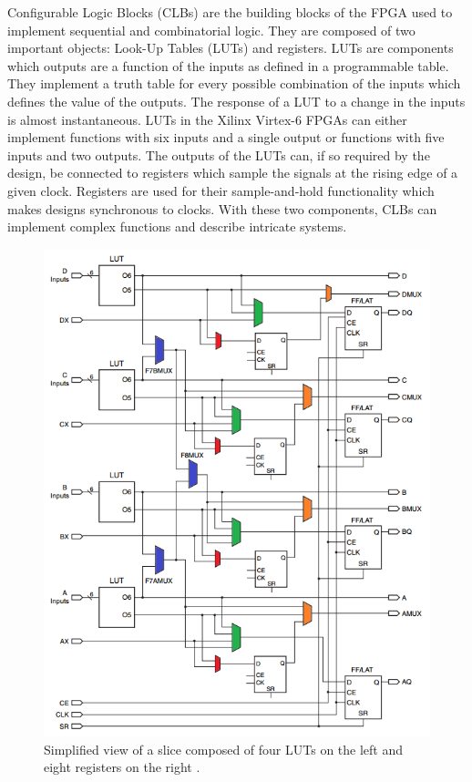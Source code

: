       Configurable Logic Blocks (CLBs) \cite{VIRTEX-CLB} are the building blocks of the FPGA used to implement sequential and combinatorial logic. They are composed of two important objects: Look-Up Tables (LUTs) and registers. LUTs are components which outputs are a function of the inputs as defined in a programmable table. They implement a truth table for every possible combination of the inputs which defines the value of the outputs. The response of a LUT to a change in the inputs is almost instantaneous. LUTs in the Xilinx Virtex-6 FPGAs can either implement functions with six inputs and a single output or functions with five inputs and two outputs. The outputs of the LUTs can, if so required by the design, be connected to registers which sample the signals at the rising edge of a given clock. Registers are used for their sample-and-hold functionality which makes designs synchronous to clocks. With these two components, CLBs can implement complex functions and describe intricate systems. \\

      \begin{figure}[p!]
        \centering
        \includegraphics[width=\textwidth]{img/II-5-irradiation/clb.png}
        \caption{Simplified view of a slice composed of four LUTs on the left and eight registers on the right \cite{VIRTEX-CLB}.}
        \label{fig:II-5-clb}
      \end{figure}

